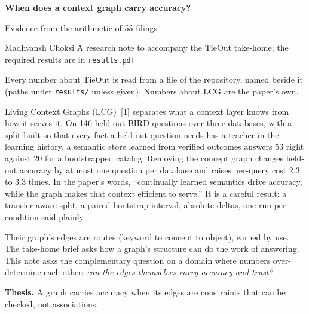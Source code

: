 \documentclass[10pt]{article}
\newcommand{\head}[1]{\vspace{5pt}{\normalsize\bfseries #1}\vspace{1pt}\par}
\newcommand{\sub}[1]{\textbf{#1}}
\begin{document}
\small

{\Large\bfseries When does a context graph carry accuracy?}\par\vspace{1pt}
{\large Evidence from the arithmetic of 55 filings}\par\vspace{3pt}
{\normalsize Madhvansh Choksi \quad\textbar\quad A research note to accompany the TieOut take-home; the required results are in \texttt{results.pdf}}\par
{\footnotesize Every number about TieOut is read from a file of the repository, named beside it (paths under \texttt{results/} unless given). Numbers about LCG are the paper's own.}\par\vspace{2pt}

\head{1. The question}
Living Context Graphs (LCG)~[1] separates what a context layer knows from how it serves it. On 146 held-out BIRD questions over three databases, with a split built so that every fact a held-out question needs has a teacher in the learning history, a semantic store learned from verified outcomes answers 53 right against 20 for a bootstrapped catalog. Removing the concept graph changes held-out accuracy by at most one question per database and raises per-query cost 2.3 to 3.3 times. In the paper's words, ``continually learned semantics drive accuracy, while the graph makes that context efficient to serve.'' It is a careful result: a transfer-aware split, a paired bootstrap interval, absolute deltas, one run per condition said plainly.

Their graph's edges are routes (keyword to concept to object), earned by use. The take-home brief asks how a graph's structure can do the work of answering. This note asks the complementary question on a domain where numbers over-determine each other: \emph{can the edges themselves carry accuracy and trust?}

\sub{Thesis.} A graph carries accuracy when its edges are constraints that can be checked, not associations.
\end{document}
